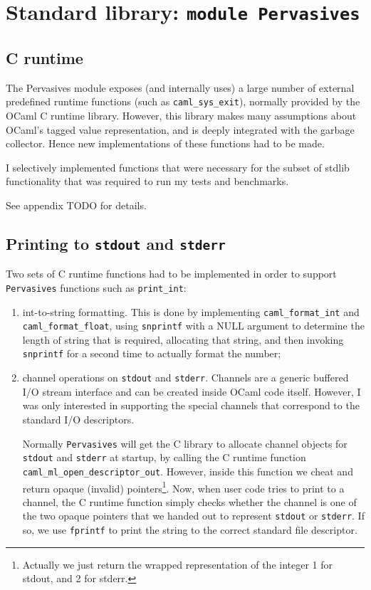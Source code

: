 \documentclass[12pt,a4paper,twoside,openright]{report}
\begin{document}
\section{Standard library: \texttt{module Pervasives}}\label{pervasives}

\subsection{C runtime}\label{pervasives-c-runtime}

The Pervasives module exposes (and internally uses) a large number of external
predefined runtime functions (such as \lstinline!caml_sys_exit!), normally
provided by the OCaml C runtime library. However, this library makes many
assumptions about OCaml's tagged value representation, and is deeply integrated
with the garbage collector. Hence new implementations of these functions had to
be made.

I selectively implemented functions that were necessary for the subset of
stdlib functionality that was required to run my tests and benchmarks.

See appendix TODO for details.

\subsection{Printing to \texttt{stdout} and \texttt{stderr}}\label{pervasives-printing}

Two sets of C runtime functions had to be implemented in order to support
\lstinline!Pervasives! functions such as \lstinline!print_int!:
\begin{enumerate}
  \item int-to-string formatting. This is done by implementing
    \lstinline!caml_format_int! and \lstinline!caml_format_float!, using
    \lstinline!snprintf! with a NULL argument to determine the length of string
    that is required, allocating that string, and then invoking
    \lstinline!snprintf! for a second time to actually format the number;
  \item channel operations on \lstinline!stdout! and \lstinline!stderr!.
    Channels are a generic buffered I/O stream interface and can be created
    inside OCaml code itself. However, I was only interested in supporting the
    special channels that correspond to the standard I/O descriptors.

    Normally \lstinline!Pervasives! will get the C library to allocate channel
    objects for \lstinline!stdout! and \lstinline!stderr! at startup, by calling the C runtime function
    \lstinline!caml_ml_open_descriptor_out!. However,
    inside this function we cheat and return opaque (invalid)
    pointers\footnote{Actually we just return the wrapped representation of the integer 1
    for stdout, and 2 for stderr.}. Now, when user code tries to
    print to a channel, the C runtime function simply checks whether the channel is
    one of the two opaque pointers that we handed out to represent
    \lstinline!stdout! or \lstinline!stderr!. If so, we use \lstinline!fprintf!
    to print the string to the correct standard file descriptor.
\end{enumerate}
\end{document}
